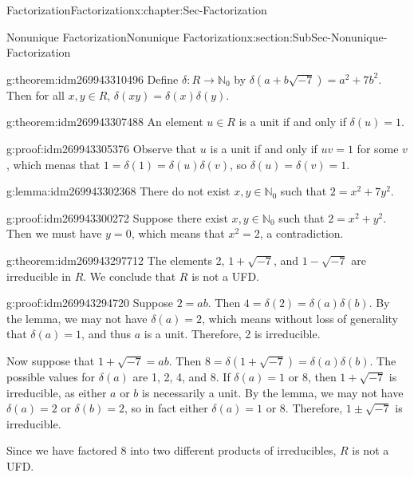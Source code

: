 \documentclass[oneside,10pt,]{book}
\numberwithin{equation}{section}
\def\N{{\mathbb N}}
\begin{document}
\begin{chapterptx}{Factorization}{}{Factorization}{}{}{x:chapter:Sec-Factorization}
\begin{sectionptx}{Nonunique Factorization}{}{Nonunique Factorization}{}{}{x:section:SubSec-Nonunique-Factorization}
\begin{theorem}{}{}{g:theorem:idm269943310496}%
Define \(\delta : R \to \N_0\) by \(\delta(a+b\sqrt{-7}) = a^2 + 7 b^2\). Then for all \(x,y\in R\), \(\delta(xy) = \delta(x)\delta(y)\).%
\end{theorem}
\begin{theorem}{}{}{g:theorem:idm269943307488}%
An element \(u\in R\) is a unit if and only if \(\delta(u) = 1\).%
\end{theorem}
\begin{proofptx}{}{g:proof:idm269943305376}
Observe that \(u\) is a unit if and only if \(uv = 1\) for some \(v\), which menas that \(1 = \delta(1) = \delta(u) \delta(v)\), so \(\delta(u) = \delta(v) = 1\).%
\end{proofptx}
\begin{lemma}{}{}{g:lemma:idm269943302368}%
There do not exist \(x,y\in \N_0\) such that \(2 = x^2 + 7y^2\).%
\end{lemma}
\begin{proofptx}{}{g:proof:idm269943300272}
Suppose there exist \(x,y\in \N_0\) such that \(2 = x^2 + y^2\). Then we must have \(y = 0\), which means that \(x^2 = 2\), a contradiction.%
\end{proofptx}
\begin{theorem}{}{}{g:theorem:idm269943297712}%
The elements 2, \(1+ \sqrt{-7}\), and \(1-\sqrt{-7}\) are irreducible in \(R\). We conclude that \(R\) is not a UFD.%
\end{theorem}
\begin{proofptx}{}{g:proof:idm269943294720}
Suppose \(2 = ab\). Then \(4 = \delta(2) = \delta(a)\delta(b)\). By the lemma, we may not have \(\delta(a) = 2\), which means without loss of generality that \(\delta(a) = 1\), and thus \(a\) is a unit. Therefore, 2 is irreducible.%
\par
Now suppose that \(1 + \sqrt{-7} = ab\). Then \(8 = \delta(1+\sqrt{-7}) = \delta(a) \delta(b)\). The possible values for \(\delta(a)\) are 1, 2, 4, and 8. If \(\delta(a) = 1\) or 8, then \(1+\sqrt{-7}\) is irreducible, as either \(a\) or \(b\) is necessarily a unit. By the lemma, we may not have \(\delta(a) = 2\) or \(\delta(b) = 2\), so in fact either \(\delta(a) = 1\) or 8. Therefore, \(1\pm \sqrt{-7}\) is irreducible.%
\par
Since we have factored 8 into two different products of irreducibles, \(R\) is not a UFD.%
\end{proofptx}
\end{sectionptx}
\end{chapterptx}
\end{document}
